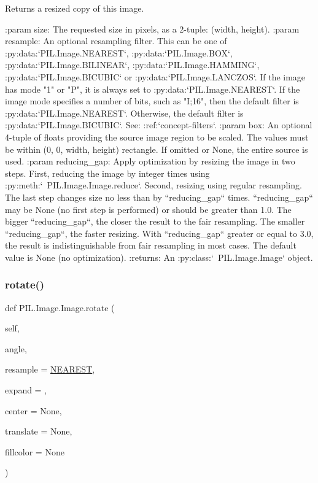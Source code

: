\begin{DoxyVerb}Returns a resized copy of this image.

:param size: The requested size in pixels, as a 2-tuple:
   (width, height).
:param resample: An optional resampling filter.  This can be
   one of :py:data:`PIL.Image.NEAREST`, :py:data:`PIL.Image.BOX`,
   :py:data:`PIL.Image.BILINEAR`, :py:data:`PIL.Image.HAMMING`,
   :py:data:`PIL.Image.BICUBIC` or :py:data:`PIL.Image.LANCZOS`.
   If the image has mode "1" or "P", it is always set to
   :py:data:`PIL.Image.NEAREST`.
   If the image mode specifies a number of bits, such as "I;16", then the
   default filter is :py:data:`PIL.Image.NEAREST`.
   Otherwise, the default filter is :py:data:`PIL.Image.BICUBIC`.
   See: :ref:`concept-filters`.
:param box: An optional 4-tuple of floats providing
   the source image region to be scaled.
   The values must be within (0, 0, width, height) rectangle.
   If omitted or None, the entire source is used.
:param reducing_gap: Apply optimization by resizing the image
   in two steps. First, reducing the image by integer times
   using :py:meth:`~PIL.Image.Image.reduce`.
   Second, resizing using regular resampling. The last step
   changes size no less than by ``reducing_gap`` times.
   ``reducing_gap`` may be None (no first step is performed)
   or should be greater than 1.0. The bigger ``reducing_gap``,
   the closer the result to the fair resampling.
   The smaller ``reducing_gap``, the faster resizing.
   With ``reducing_gap`` greater or equal to 3.0, the result is
   indistinguishable from fair resampling in most cases.
   The default value is None (no optimization).
:returns: An :py:class:`~PIL.Image.Image` object.
\end{DoxyVerb}
 \mbox{\label{classPIL_1_1Image_1_1Image_a3f95cddf9b9e284dc05f6e2d633d5fbf}} 
\subsubsection{\texorpdfstring{rotate()}{rotate()}}
{\footnotesize\ttfamily def P\+I\+L.\+Image.\+Image.\+rotate (\begin{DoxyParamCaption}\item[{}]{self,  }\item[{}]{angle,  }\item[{}]{resample = {\ttfamily \hyperlink{namespacePIL_1_1Image_afd842ab6c443c96339eb08e18ba4d206}{N\+E\+A\+R\+E\+ST}},  }\item[{}]{expand = {},  }\item[{}]{center = {\ttfamily None},  }\item[{}]{translate = {\ttfamily None},  }\item[{}]{fillcolor = {\ttfamily None} }\end{DoxyParamCaption})}

